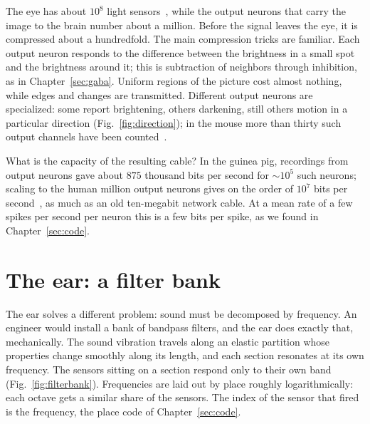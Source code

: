 The eye has about $10^8$ light sensors~\cite{Curcio1990}, while the output neurons that carry the image to the brain number about a million. Before the signal leaves the eye, it is compressed about a hundredfold. The main compression tricks are familiar. Each output neuron responds to the difference between the brightness in a small spot and the brightness around it; this is subtraction of neighbors through inhibition, as in Chapter~\ref{sec:gaba}. Uniform regions of the picture cost almost nothing, while edges and changes are transmitted. Different output neurons are specialized: some report brightening, others darkening, still others motion in a particular direction (Fig.~\ref{fig:direction}); in the mouse more than thirty such output channels have been counted~\cite{Baden2016}.

What is the capacity of the resulting cable? In the guinea pig, recordings from output neurons gave about $875$ thousand bits per second for $\sim10^5$ such neurons; scaling to the human million output neurons gives on the order of $10^7$ bits per second~\cite{Koch2006}, as much as an old ten-megabit network cable. At a mean rate of a few spikes per second per neuron this is a few bits per spike, as we found in Chapter~\ref{sec:code}.

\section{The ear: a filter bank}

The ear solves a different problem: sound must be decomposed by frequency. An engineer would install a bank of bandpass filters, and the ear does exactly that, mechanically. The sound vibration travels along an elastic partition whose properties change smoothly along its length, and each section resonates at its own frequency. The sensors sitting on a section respond only to their own band (Fig.~\ref{fig:filterbank}). Frequencies are laid out by place roughly logarithmically: each octave gets a similar share of the sensors. The index of the sensor that fired is the frequency, the place code of Chapter~\ref{sec:code}.

